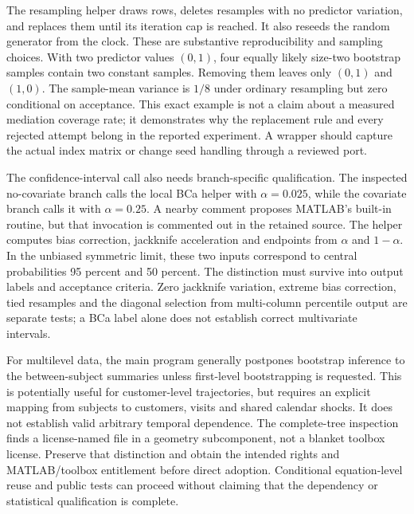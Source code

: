 The resampling helper draws rows, deletes resamples with no predictor variation,
and replaces them until its iteration cap is reached. It also reseeds the random
generator from the clock. These are substantive reproducibility and sampling
choices. With two predictor values $(0,1)$, four equally likely size-two bootstrap
samples contain two constant samples. Removing them leaves only $(0,1)$ and
$(1,0)$. The sample-mean variance is $1/8$ under ordinary resampling but zero
conditional on acceptance. This exact example is not a claim about a measured
mediation coverage rate; it demonstrates why the replacement rule and every
rejected attempt belong in the reported experiment. A wrapper should capture
the actual index matrix or change seed handling through a reviewed port.
\citep{exec25_omed_canlab,exec25_omed_choice}

The confidence-interval call also needs branch-specific qualification. The
inspected no-covariate branch calls the local BCa helper with $\alpha=0.025$,
while the covariate branch calls it with $\alpha=0.25$. A nearby comment proposes
MATLAB's built-in routine, but that invocation is commented out in the retained
source. The helper computes bias correction, jackknife acceleration and endpoints
from $\alpha$ and $1-\alpha$. In the unbiased symmetric limit, these two inputs
correspond to central probabilities 95 percent and 50 percent. The distinction
must survive into output labels and acceptance criteria. Zero jackknife
variation, extreme bias correction, tied resamples and the diagonal selection
from multi-column percentile output are separate tests; a BCa label alone does
not establish correct multivariate intervals.~\citep{exec25_omed_canlab,exec25_omed_choice}

For multilevel data, the main program generally postpones bootstrap inference
to the between-subject summaries unless first-level bootstrapping is requested.
This is potentially useful for customer-level trajectories, but requires an
explicit mapping from subjects to customers, visits and shared calendar shocks.
It does not establish valid arbitrary temporal dependence. The complete-tree
inspection finds a license-named file in a geometry subcomponent, not a blanket
toolbox license. Preserve that distinction and obtain the intended rights and
MATLAB/toolbox entitlement before direct adoption. Conditional equation-level
reuse and public tests can proceed without claiming that the dependency or
statistical qualification is complete.~\citep{exec25_omed_canlab,exec25_omed_choice}

